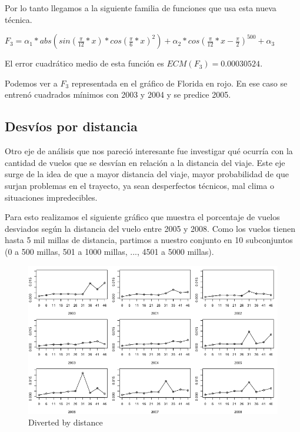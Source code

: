Por lo tanto llegamos a la siguiente familia de funciones que usa esta nueva t\'ecnica.

$F_3 = \alpha_1 * abs(sin(\frac{\pi}{12}*x) * cos(\frac{\pi}{6}*x)^2) + \alpha_2 * cos(\frac{\pi}{12}*x - \frac{\pi}{2})^{500} + \alpha_3$

El error cuadr\'atico medio de esta funci\'on es $ECM(F_3) = 0.00030524$.

Podemos ver a $F_3$ representada en el gr\'afico de Florida en rojo. En ese caso se entren\'o cuadrados m\'inimos con 2003 y 2004 y se predice 2005.

\subsection{Desv\'ios por distancia}

Otro eje de an\'alisis que nos pareci\'o interesante fue investigar qu\'e ocurr\'ia con la cantidad de vuelos que se desv\'ian en relaci\'on a la distancia del viaje. Este eje surge de la idea de que a mayor distancia del viaje, mayor probabilidad de que surjan problemas en el trayecto, ya sean desperfectos t\'ecnicos, mal clima o situaciones impredecibles.

Para esto realizamos el siguiente gr\'afico que muestra el porcentaje de vuelos desviados seg\'un la distancia del vuelo entre 2005 y 2008. Como los vuelos tienen hasta 5 mil millas de distancia, partimos a nuestro conjunto en 10 subconjuntos (0 a 500 millas, 501 a 1000 millas, ..., 4501 a 5000 millas).

\begin{figure}[h!]
  \begin{center}
	\includegraphics[scale=0.4]{img/diverted_by_distance.png}
	\caption{Diverted by distance}
  \end{center}
\end{figure}

